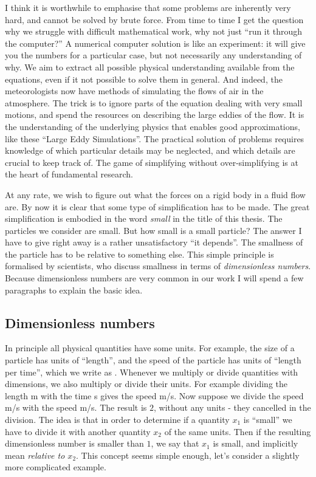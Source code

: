 \documentclass[thesis.tex]{subfiles}
\begin{document}
I think it is worthwhile to emphasise that some problems are inherently very hard, and cannot be solved by brute force. From time to time I get the question why we struggle with difficult mathematical work, why not just ``run it through the computer?'' A numerical computer solution is like an experiment: it will give you the numbers for a particular case, but not necessarily any understanding of why. We aim to extract all possible physical understanding available from the equations, even if it not possible to solve them in general. And indeed, the meteorologists now have methods of simulating the flows of air in the atmosphere. The trick is to ignore parts of the equation dealing with very small motions, and spend the resources on describing the large eddies of the flow. It is the understanding of the underlying physics that enables good approximations, like these ``Large Eddy Simulations''. The practical solution of problems requires knowledge of which particular details may be neglected, and which details are crucial to keep track of. The game of simplifying without over-simplifying is at the heart of fundamental research.

At any rate, we wish to figure out what the forces on a rigid body in a fluid flow are. By now it is clear that some type of simplification has to be made. The great simplification is embodied in the word \emph{small} in the title of this thesis. The particles we consider are small. But how small is a small particle? The answer I have to give right away is a rather unsatisfactory ``it depends''. The smallness of the particle has to be relative to something else. This simple principle is formalised by scientists, who discuss smallness in terms of \emph{dimensionless numbers}. Because dimensionless numbers are very common in our work I will spend a few paragraphs to explain the basic idea.

\subsection*{Dimensionless numbers}

In principle all physical quantities have some units. For example, the size of a particle has units of ``length'', and the speed of the particle has units of ``length per time'', which we write as . Whenever we multiply or divide quantities with dimensions, we also multiply or divide their units. For example dividing the length \unit[20]{m} with the time \unit[5]{s} gives the speed \unit[4]{m/s}. Now suppose we divide the speed \unit[4]{m/s} with the speed \unit[2]{m/s}. The result is $2$, without any units - they cancelled in the division. The idea is that in order to determine if a quantity $x_1$ is ``small'' we have to divide it with another quantity $x_2$ of the same units. Then if the resulting dimensionless number is smaller than $1$, we say that $x_1$ is small, and implicitly mean \emph{relative to $x_2$}.  This concept seems simple enough, let's consider a slightly more complicated example.
\end{document}
